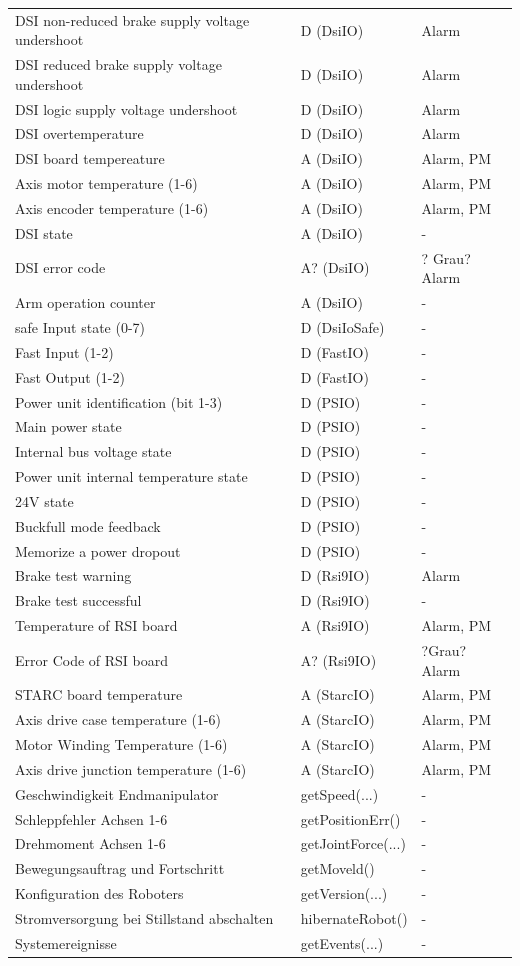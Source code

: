 \documentclass[ a4paper,
                oneside,
                toc=bibliography,
                toc=listof
                ]{scrbook}
\begin{document}
\begin{longtable}{|p{7cm}|p{3cm}|p{3cm}|}
		DSI non-reduced brake supply voltage undershoot & D (DsiIO) & Alarm \\
		DSI reduced brake supply voltage undershoot & D (DsiIO) & Alarm \\
		DSI logic supply voltage undershoot & D (DsiIO) & Alarm \\
		DSI overtemperature & D (DsiIO) & Alarm \\
		\hline
		DSI board tempereature & A (DsiIO) & Alarm, PM \\
		Axis motor temperature (1-6) & A (DsiIO) & Alarm, PM \\
		Axis encoder temperature (1-6) & A (DsiIO) & Alarm, PM \\
		DSI state & A (DsiIO) & - \\
		DSI error code & A? (DsiIO) & ? Grau? Alarm \\
		Arm operation counter & A (DsiIO) & - \\
		\hline
		safe Input state (0-7) & D (DsiIoSafe) & - \\
		\hline
		Fast Input (1-2) & D (FastIO) & - \\
		Fast Output (1-2) & D (FastIO) & - \\
		\hline
		Power unit identification (bit 1-3) & D (PSIO) & - \\
		Main power state & D (PSIO) & - \\
		Internal bus voltage state & D (PSIO) & - \\
		Power unit internal temperature state & D (PSIO) & - \\
		24V state & D (PSIO) & - \\
		Buckfull mode feedback & D (PSIO) & - \\
		Memorize a power dropout & D (PSIO) & - \\
		\hline
		Brake test warning & D (Rsi9IO) & Alarm \\
		Brake test successful & D (Rsi9IO) & - \\
		Temperature of RSI board & A (Rsi9IO) & Alarm, PM \\
		Error Code of RSI board & A? (Rsi9IO) & ?Grau? Alarm \\
		\hline
		STARC board temperature & A (StarcIO) & Alarm, PM \\
		Axis drive case temperature (1-6) & A (StarcIO) & Alarm, PM \\
		Motor Winding Temperature (1-6) & A (StarcIO) & Alarm, PM \\
		Axis drive junction temperature (1-6) & A (StarcIO) & Alarm, PM \\		
		\hline
		Geschwindigkeit Endmanipulator & getSpeed(...) & - \\
		Schleppfehler Achsen 1-6 & getPositionErr()  & - \\
		Drehmoment Achsen 1-6 & getJointForce(...)  & - \\
		Bewegungsauftrag und Fortschritt & getMoveld()  & - \\
		Konfiguration des Roboters & getVersion(...)  & - \\
		Stromversorgung bei Stillstand abschalten & hibernateRobot()  & - \\
		Systemereignisse &getEvents(...)  & - \\
			

\end{longtable}
\end{document}
